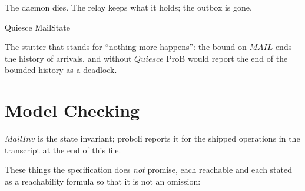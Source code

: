 \documentclass[a4paper,10pt,fleqn]{article}
\begin{document}
The daemon dies.  The relay keeps what it holds; the outbox is gone.

\begin{schema}{Quiesce}
  \Xi MailState
\end{schema}

The stutter that stands for ``nothing more happens'': the bound on
$MAIL$ ends the history of arrivals, and without $Quiesce$ ProB would
report the end of the bounded history as a deadlock.

\section{Model Checking}

$MailInv$ is the state invariant; probcli reports it for the shipped
operations in the transcript at the end of this file.

These things the specification does \emph{not} promise, each reachable and
each stated as a reachability formula so that it is not an omission:
\end{document}
